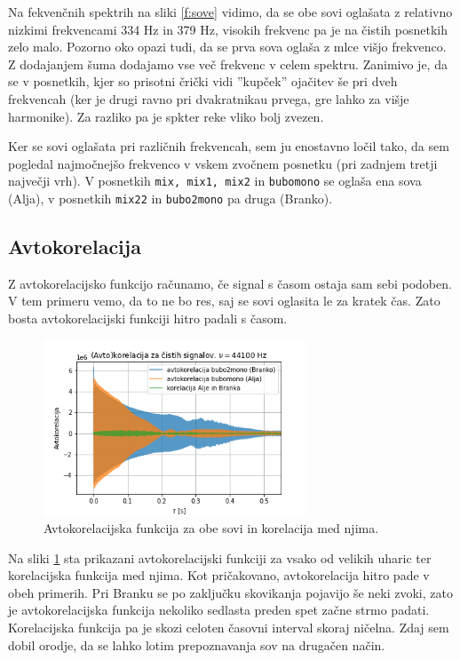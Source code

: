\documentclass[a4paper, 12pt, slovene]{article}
\begin{document}
Na fekvenčnih spektrih na sliki \ref{f:sove} vidimo, da se obe sovi oglašata z relativno nizkimi frekvencami 334 Hz in 379 Hz, visokih frekvenc pa je na čistih posnetkih zelo malo. Pozorno oko opazi tudi, da se prva sova oglaša z mlce višjo frekvenco. Z dodajanjem šuma dodajamo vse več frekvenc v celem spektru. Zanimivo je, da se v posnetkih, kjer so prisotni črički vidi ''kupček'' ojačitev še pri dveh frekvencah (ker je drugi ravno pri dvakratnikau prvega, gre lahko za višje harmonike). Za razliko pa je spkter reke vliko bolj zvezen. \par\vspace{5mm}

Ker se sovi oglašata pri različnih frekvencah, sem ju enostavno ločil tako, da sem pogledal najmočnejšo frekvenco v vskem zvočnem posnetku (pri zadnjem tretji največji vrh). V posnetkih \texttt{mix, mix1, mix2} in \texttt{bubomono} se oglaša ena sova (Alja), v posnetkih \texttt{mix22} in \texttt{bubo2mono} pa druga (Branko).


\subsection{Avtokorelacija}
Z avtokorelacijsko funkcijo računamo, če signal s časom ostaja sam sebi podoben. V tem primeru vemo, da to ne bo res, saj se sovi oglasita le za kratek čas. Zato bosta avtokorelacijski funkciji hitro padali s časom. \par\vspace{5mm}

\begin{figure}[H]
\centering
\includegraphics[width=0.7\textwidth]{grafi/avtokorelacija-sove-lim.png}
\caption{Avtokorelacijska funkcija za obe sovi in korelacija med njima.}
\label{f:autokor-sove}
\end{figure}

Na sliki \ref{f:autokor-sove} sta prikazani avtokorelacijski funkciji za vsako od velikih uharic ter korelacijska funkcija med njima. Kot pričakovano, avtokorelacija hitro pade v obeh primerih. Pri Branku se po zaključku skovikanja pojavijo še neki zvoki, zato je avtokorelacijska funkcija nekoliko sedlasta preden spet začne strmo padati. Korelacijska funkcija pa je skozi celoten časovni interval skoraj ničelna. Zdaj sem dobil orodje, da se lahko lotim prepoznavanja sov na drugačen način.
\end{document}
